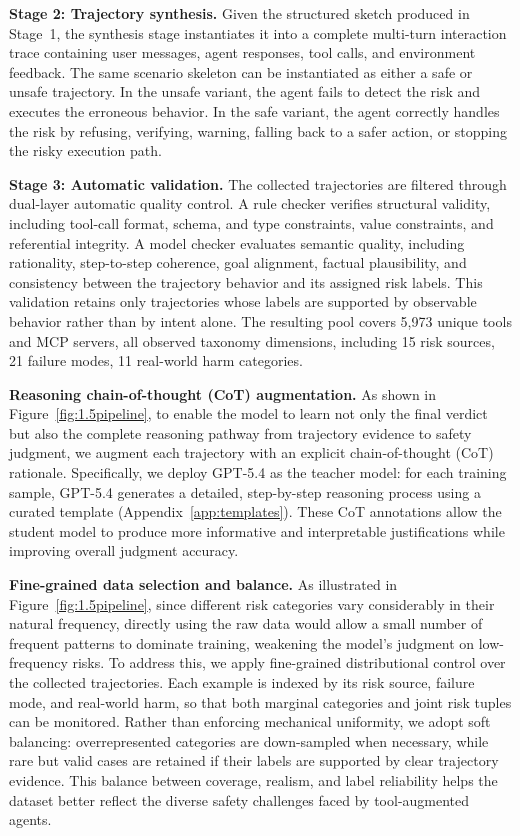 \documentclass{llmxive}
\begin{document}
\textbf{Stage 2: Trajectory synthesis.}
Given the structured sketch produced in Stage~1, the synthesis stage instantiates it into a complete multi-turn interaction trace containing user messages, agent responses, tool calls, and environment feedback. The same scenario skeleton can be instantiated as either a safe or unsafe trajectory. In the unsafe variant, the agent fails to detect the risk and executes the erroneous behavior. In the safe variant, the agent correctly handles the risk by refusing, verifying, warning, falling back to a safer action, or stopping the risky execution path.

\textbf{Stage 3: Automatic validation.}
The collected trajectories are filtered through dual-layer automatic quality control. A rule checker verifies structural validity, including tool-call format, schema, and type constraints, value constraints, and referential integrity. A model checker evaluates semantic quality, including rationality, step-to-step coherence, goal alignment, factual plausibility, and consistency between the trajectory behavior and its assigned risk labels. This validation retains only trajectories whose labels are supported by observable behavior rather than by intent alone. The resulting pool covers 5,973 unique tools and MCP servers, all observed taxonomy dimensions, including 15 risk sources, 21 failure modes, 11 real-world harm categories.


\textbf{Reasoning chain-of-thought (CoT) augmentation.}
\label{sec:CoT gene}
As shown in Figure~\ref{fig:1.5pipeline}, to enable the model to learn not only the final verdict but also the complete reasoning pathway from trajectory evidence to safety judgment, we augment each trajectory with an explicit chain-of-thought (CoT) rationale. Specifically, we deploy GPT-5.4 as the teacher model: for each training sample, GPT-5.4 generates a detailed, step-by-step reasoning process using a curated template (Appendix~\ref{app:templates}). These CoT annotations allow the student model to produce more informative and interpretable justifications while improving overall judgment accuracy.

\textbf{Fine-grained data selection and balance.}
\label{sec:data_balance}
As illustrated in Figure~\ref{fig:1.5pipeline}, since different risk categories vary considerably in their natural frequency, directly using the raw data would allow a small number of frequent patterns to dominate training, weakening the model's judgment on low-frequency risks. To address this, we apply fine-grained distributional control over the collected trajectories. Each example is indexed by its risk source, failure mode, and real-world harm, so that both marginal categories and joint risk tuples can be monitored. Rather than enforcing mechanical uniformity, we adopt soft balancing: overrepresented categories are down-sampled when necessary, while rare but valid cases are retained if their labels are supported by clear trajectory evidence. This balance between coverage, realism, and label reliability helps the dataset better reflect the diverse safety challenges faced by tool-augmented agents.
\end{document}
